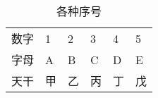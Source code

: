 \documentclass [nofonts]{ctexart}
\begin{document}
\begin{longtabu} to 0.5 \textwidth{|c|X|X|X|X|X|}
\hline
\endhead
\hline
\endfoot
\caption{各种序号}	\\
\hline
\endfirsthead
数字	& 1	& 2	& 3	& 4	& 5		\\
\hline
字母	& A	& B	& C	& D	& E		\\
\hline
天干	& 甲& 乙& 丙& 丁& 戊	\\
\end{longtabu}
\end{document}
